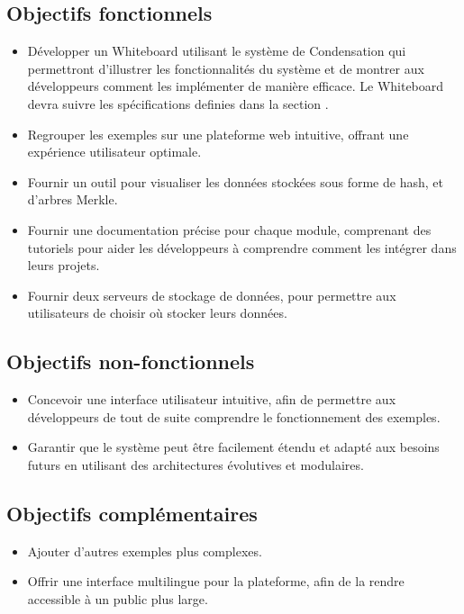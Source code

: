 \subsection*{Objectifs \guillemotleft fonctionnels\guillemotright}

\begin{itemize}
    \item Développer un Whiteboard utilisant le système de Condensation qui permettront d'illustrer les fonctionnalités du système et de montrer aux développeurs comment les implémenter de manière efficace. Le Whiteboard devra suivre les spécifications definies dans la section .
    \item Regrouper les exemples sur une plateforme web intuitive, offrant une expérience utilisateur optimale.
    \item Fournir un outil pour visualiser les données stockées sous forme de hash, et d'arbres Merkle.
    \item Fournir une documentation précise pour chaque module, comprenant des tutoriels pour aider les développeurs à comprendre comment les intégrer dans leurs projets.
    \item Fournir deux serveurs de stockage de données, pour permettre aux utilisateurs de choisir où stocker leurs données.
\end{itemize}

\subsection*{Objectifs \guillemotleft non-fonctionnels\guillemotright}

\begin{itemize}
    \item Concevoir une interface utilisateur intuitive, afin de permettre aux développeurs de tout de suite comprendre le fonctionnement des exemples.
    \item Garantir que le système peut être facilement étendu et adapté aux besoins futurs en utilisant des architectures évolutives et modulaires.
\end{itemize}

\subsection*{Objectifs \guillemotleft complémentaires\guillemotright}

\begin{itemize}
    \item Ajouter d'autres exemples plus complexes.
    \item Offrir une interface multilingue pour la plateforme, afin de la rendre accessible à un public plus large.
\end{itemize}

